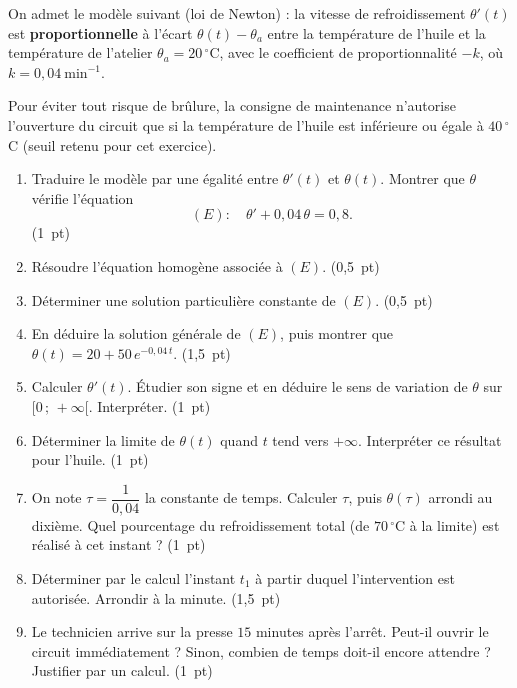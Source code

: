 \documentclass[a4paper,11pt]{article}
\newcommand{\rep}[1]{\par\noindent\begin{minipage}[t][#1cm]{\linewidth}\mbox{}\end{minipage}\par}
\newcommand{\pts}[1]{\unskip\nobreak\hfill\mbox{\small\color{uimmgray}(#1)}}
\begin{document}
On admet le modèle suivant (loi de Newton) : la vitesse de refroidissement $\theta'(t)$ est \textbf{proportionnelle} à l'écart $\theta(t) - \theta_a$ entre la température de l'huile et la température de l'atelier $\theta_a = 20\,^\circ$C, avec le coefficient de proportionnalité $-k$, où $k = 0{,}04\ \text{min}^{-1}$.

Pour éviter tout risque de brûlure, la consigne de maintenance n'autorise l'ouverture du circuit que si la température de l'huile est inférieure ou égale à $40\,^\circ$C (seuil retenu pour cet exercice).

\begin{enumerate}
  \needspace{4.6cm}
  \item Traduire le modèle par une égalité entre $\theta'(t)$ et $\theta(t)$. Montrer que $\theta$ vérifie l'équation \[ (E) : \quad \theta' + 0{,}04\,\theta = 0{,}8 . \] \pts{1 pt}
  \rep{3.0}
  \needspace{3.1cm}
  \item Résoudre l'équation homogène associée à $(E)$. \pts{0,5 pt}
  \rep{1.5}
  \needspace{3.1cm}
  \item Déterminer une solution particulière constante de $(E)$. \pts{0,5 pt}
  \rep{1.5}
  \needspace{5.6cm}
  \item En déduire la solution générale de $(E)$, puis montrer que $\theta(t) = 20 + 50\,e^{-0{,}04\,t}$. \pts{1,5 pt}
  \rep{4.0}
  \needspace{4.6cm}
  \item Calculer $\theta'(t)$. Étudier son signe et en déduire le sens de variation de $\theta$ sur $[0\,;\,+\infty[$. Interpréter. \pts{1 pt}
  \rep{3.0}
  \needspace{3.6cm}
  \item Déterminer la limite de $\theta(t)$ quand $t$ tend vers $+\infty$. Interpréter ce résultat pour l'huile. \pts{1 pt}
  \rep{2.0}
  \needspace{4.6cm}
  \item On note $\tau = \dfrac{1}{0{,}04}$ la constante de temps. Calculer $\tau$, puis $\theta(\tau)$ arrondi au dixième. Quel pourcentage du refroidissement total (de $70\,^\circ$C à la limite) est réalisé à cet instant ? \pts{1 pt}
  \rep{3.0}
  \needspace{5.6cm}
  \item Déterminer par le calcul l'instant $t_1$ à partir duquel l'intervention est autorisée. Arrondir à la minute. \pts{1,5 pt}
  \rep{4.0}
  \needspace{4.6cm}
  \item Le technicien arrive sur la presse $15$ minutes après l'arrêt. Peut-il ouvrir le circuit immédiatement ? Sinon, combien de temps doit-il encore attendre ? Justifier par un calcul. \pts{1 pt}
  \rep{3.0}
\end{enumerate}
\end{document}
